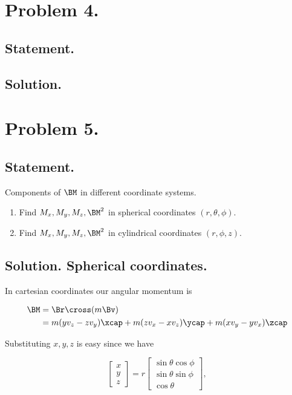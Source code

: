 \section{Problem 4.}
\subsection{Statement.}
\subsection{Solution.}
\section{Problem 5.}
\subsection{Statement.}

Components of $\BM$ in different coordinate systems.

\begin{enumerate}
\item Find $M_x, M_y, M_z, \BM^2$ in spherical coordinates $(r, \theta, \phi)$.
\item Find $M_x, M_y, M_z, \BM^2$ in cylindrical coordinates $(r, \phi, z)$.
\end{enumerate}


\subsection{Solution. Spherical coordinates.}

In cartesian coordinates our angular momentum is

\begin{align*}
\BM
&= \Br \cross (m \Bv) \\
&=
m (y v_z - z v_y) \xcap
+m (z v_x - x v_z) \ycap
+m (x v_y - y v_x) \zcap
\end{align*}

Substituting $x,y,z$ is easy since we have

\begin{equation}\label{eqn:classicalMechanicsPs2:10}
\begin{bmatrix}
x \\
y \\
z
\end{bmatrix}
=
r
\begin{bmatrix}
\sin\theta \cos\phi \\
\sin\theta \sin\phi \\
\cos\theta
\end{bmatrix},
\end{equation}


